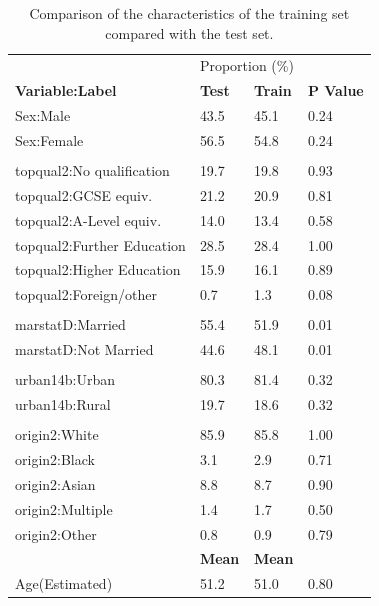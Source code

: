 \documentclass[
  11pt,
  twocolumn]{article}
\begin{document}
\begin{table}
\centering
\caption{\label{tab:outputtesttraintable}Comparison of the characteristics of the training set compared with the test set.\label{tab:output-testtrain-table}}
\centering
\fontsize{10}{12}\selectfont
\begin{tabular}[t]{l|l|l|l}
\hline
\multicolumn{1}{c|}{ } & \multicolumn{2}{c}{Proportion (\%)} \\
\cline{2-3}
\textbf{Variable:Label} & \textbf{Test} & \textbf{Train} & \textbf{P Value}\\
\hline
Sex:Male & 43.5 & 45.1 & 0.24\\
\hline
Sex:Female & 56.5 & 54.8 & 0.24\\
\hline
 &  &  \vphantom{3} & \\
\hline
topqual2:No qualification & 19.7 & 19.8 & 0.93\\
\hline
topqual2:GCSE equiv. & 21.2 & 20.9 & 0.81\\
\hline
topqual2:A-Level equiv. & 14.0 & 13.4 & 0.58\\
\hline
topqual2:Further Education & 28.5 & 28.4 & 1.00\\
\hline
topqual2:Higher Education & 15.9 & 16.1 & 0.89\\
\hline
topqual2:Foreign/other & 0.7 & 1.3 & 0.08\\
\hline
 &  &  \vphantom{2} & \\
\hline
marstatD:Married & 55.4 & 51.9 & 0.01\\
\hline
marstatD:Not Married & 44.6 & 48.1 & 0.01\\
\hline
 &  &  \vphantom{1} & \\
\hline
urban14b:Urban & 80.3 & 81.4 & 0.32\\
\hline
urban14b:Rural & 19.7 & 18.6 & 0.32\\
\hline
 &  &  & \\
\hline
origin2:White & 85.9 & 85.8 & 1.00\\
\hline
origin2:Black & 3.1 & 2.9 & 0.71\\
\hline
origin2:Asian & 8.8 & 8.7 & 0.90\\
\hline
origin2:Multiple & 1.4 & 1.7 & 0.50\\
\hline
origin2:Other & 0.8 & 0.9 & 0.79\\
\hline
\textbf{} & \textbf{Mean} & \textbf{Mean} & \textbf{}\\
\hline
Age(Estimated) & 51.2 & 51.0 & 0.80\\
\hline
\end{tabular}
\end{table}
\end{document}
